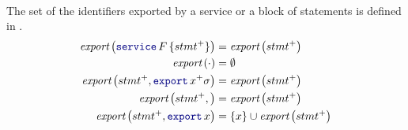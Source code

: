 \begin{definition}
\begin{align}
    \end{align}
    The set of the identifiers exported by a service or a block of statements is defined in
    .
    \begin{align}
        \exportSet{\service{F}{stmt^+}}          & = \exportSet{stmt^+}\label{eq:semantics:grfrp:theorems:determinism:sets:export:service}           \\
        \exportSet{\skp}                         & = \emptyset\label{eq:semantics:grfrp:theorems:determinism:sets:export:skip}                       \\
        \exportSet{stmt^+, \export{x^+}{\sigma}} & = \exportSet{stmt^+}\label{eq:semantics:grfrp:theorems:determinism:sets:export:decl}              \\
        \exportSet{stmt^+, }           & = \exportSet{stmt^+}\label{eq:semantics:grfrp:theorems:determinism:sets:export:import}            \\
        \exportSet{stmt^+, \export{x}}           & = \{x\} \cup \exportSet{stmt^+}\label{eq:semantics:grfrp:theorems:determinism:sets:export:export}
    \end{align}
\end{definition}

